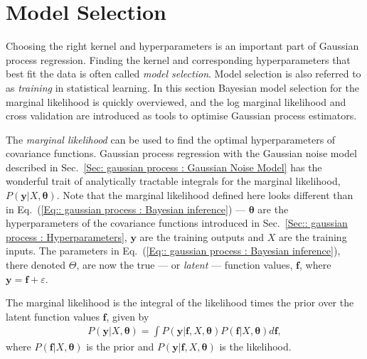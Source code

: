 \documentclass[twoside,english]{uiofysmaster}
\begin{document}
{{\section{Model Selection}

Choosing the right kernel and hyperparameters is an important part of Gaussian process regression. Finding the  kernel and corresponding hyperparameters that best fit the data is often called \textit{model selection}. Model selection is also referred to as \textit{training} in statistical learning. In this section Bayesian model selection for the marginal likelihood is quickly overviewed, and the log marginal likelihood and cross validation are introduced as tools to optimise Gaussian process estimators.



The \textit{marginal likelihood} can be used to find the optimal hyperparameters of covariance functions. Gaussian process regression with the Gaussian noise model described in Sec.~\ref{Sec: gaussian process : Gaussian Noise Model} has the wonderful trait of analytically tractable integrals for the marginal likelihood, $P(\textbf{y}|X, \boldsymbol{\theta})$. Note that the marginal likelihood defined here looks different than in Eq.~(\ref{Eq:: gaussian process : Bayesian inference}) --- $\boldsymbol{\theta}$ are the hyperparameters of the covariance functions introduced in Sec.~\ref{Sec:: gaussian process : Hyperparameters}, $\textbf{y}$ are the training outputs and $X$ are the training inputs. The parameters in Eq.~(\ref{Eq:: gaussian process : Bayesian inference}), there denoted $\Theta$, are now the true --- or \textit{latent} --- function values, $\textbf{f}$, where $\textbf{y} = \textbf{f} + \varepsilon$. 

The marginal likelihood is the integral of the likelihood times the prior over the latent function values $\textbf{f}$, given by
\begin{align}\label{Eq:: gaussian process : Marginal likelihood}
P(\textbf{y} | X, \boldsymbol{\theta}) = \int P(\textbf{y}| \textbf{f}, X, \boldsymbol{\theta}) P (\textbf{f}|X, \boldsymbol{\theta})d \textbf{f},
\end{align}
where $P(\textbf{f}|X, \boldsymbol{\theta})$ is the prior and $P(\textbf{y}|\textbf{f},X, \boldsymbol{\theta})$ is the likelihood. 

}}
\end{document}
